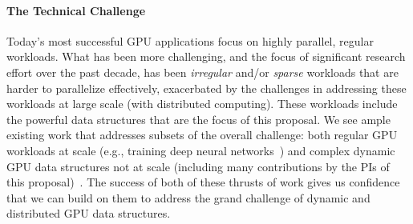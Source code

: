\paragraph{The Technical Challenge} Today's most successful GPU applications focus on
highly parallel, regular workloads. 
What has been more challenging, and the
focus of significant research effort  over the past decade, has been
\emph{irregular} and/or \emph{sparse} workloads that are harder to parallelize
effectively, exacerbated by the challenges in addressing these workloads at
large scale (with distributed computing). These workloads include the powerful
data structures that are the focus of this proposal. We see ample existing work
that addresses subsets of the overall challenge: both regular GPU workloads at
scale (e.g., training deep neural networks~\cite{Dubey:2024:TL3}) and complex dynamic GPU data
structures not at scale (including many contributions by the PIs of this
proposal)~\cite{Ashkiani:2018:ADH,Awad:2019:EAH,Junger:2020:WAL,Li:2021:DDH,mccoy2022high,Zhou:2021:DAD}.
 The success of both of these thrusts of work gives us confidence
that we can build on them to address the grand challenge of dynamic and
distributed GPU data structures.





